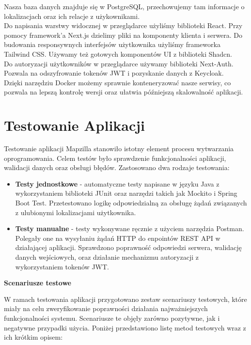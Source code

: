 \documentclass{article}
\begin{document}
Nasza baza danych znajduje się w PostgreSQL, przechowujemy tam informacje o lokalizacjach oraz ich relacje z użykownikami.
\\

Do napisania warstwy widocznej w przeglądarce użyliśmy biblioteki React. Przy pomocy framework'a Next.js dzielimy pliki na komponenty klienta i serwera. Do budowania responsywnych interfejsów użytkownika użyliśmy frameworka Tailwind CSS. Używamy też gotowych komponentów UI z biblioteki Shadcn.
\\

Do autoryzacji użytkowników w przeglądarce używamy biblioteki Next-Auth. Pozwala na odszyfrowanie tokenów JWT i pozyskanie danych z Keycloak. 
\\

Dzięki narzędziu Docker możemy sprawnie konteneryzować nasze serwisy, co pozwala na lepszą kontrolę wersji oraz ułatwia późniejszą skalowalność aplikacji.
\\


\section{Testowanie Aplikacji}

Testowanie aplikacji Mapzilla stanowiło istotny element procesu wytwarzania oprogramowania. Celem testów było sprawdzenie funkcjonalności aplikacji, walidacji danych oraz obsługi błędów. Zastosowano dwa rodzaje testowania: 

\begin{itemize}
    \item \textbf{Testy jednostkowe} - automatyczne testy napisane w języku Java z wykorzystaniem biblioteki JUnit oraz narzędzi takich jak Mockito i Spring Boot Test. Przetestowano logikę odpowiedzialną za obsługę żądań związanych z ulubionymi lokalizacjami użytkownika.
    \item \textbf{Testy manualne} - testy wykonywane ręcznie z użyciem narzędzia Postman. Polegały one na wysyłaniu żądań HTTP do enpointów REST API w działającej aplikacji. Sprawdzono poprawność odpowiedzi serwera, walidację danych wejściowych, oraz działanie mechanizmu autoryzacji z wykorzystaniem tokenów JWT.
\end{itemize}

\noindent\textbf{Scenariusze testowe} 

W ramach testowania aplikacji przygotowano zestaw scenariuszy testowych, które miały na celu zweryfikowanie poprawności działania najważniejszych funkcjonalności systemu. Scenariusze te objęły zarówno pozytywne, jak i negatywne przypadki użycia. Poniżej przedstawiono listę metod testowych wraz z ich krótkim opisem:
\end{document}
